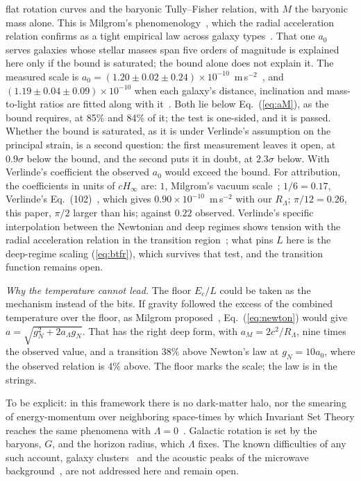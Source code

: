 \documentclass[aps,prd,twocolumn,superscriptaddress,nofootinbib,showkeys]{revtex4-2}
\newcommand{\Ec}{E_c}
\newcommand{\RL}{R_\Lambda}
\begin{document}
flat rotation curves and the baryonic Tully--Fisher relation, with $M$ the baryonic mass alone. This is Milgrom's phenomenology~\cite{milgrom1983}, which the radial acceleration relation confirms as a tight empirical law across galaxy types~\cite{mcgaugh2016}. That one $a_0$ serves galaxies whose stellar masses span five orders of magnitude is explained here only if the bound is saturated; the bound alone does not explain it. The measured scale is $a_0 = (1.20\pm0.02\pm0.24)\times10^{-10}$~m\,s$^{-2}$~\cite{mcgaugh2016}, and $(1.19\pm0.04\pm0.09)\times10^{-10}$ when each galaxy's distance, inclination and mass-to-light ratios are fitted along with it~\cite{desmond2023}. Both lie below Eq.~(\ref{eq:aM}), as the bound requires, at 85\% and 84\% of it; the test is one-sided, and it is passed. Whether the bound is saturated, as it is under Verlinde's assumption on the principal strain, is a second question: the first measurement leaves it open, at $0.9\sigma$ below the bound, and the second puts it in doubt, at $2.3\sigma$ below. With Verlinde's coefficient the observed $a_0$ would exceed the bound. For attribution, the coefficients in units of $cH_\infty$ are: $1$, Milgrom's vacuum scale~\cite{milgrom1999}; $1/6 = 0.17$, Verlinde's Eq.~(102)~\cite{verlinde2017}, which gives $0.90\times10^{-10}$~m\,s$^{-2}$ with our $\RL$; $\pi/12 = 0.26$, this paper, $\pi/2$ larger than his; against $0.22$ observed. Verlinde's specific interpolation between the Newtonian and deep regimes shows tension with the radial acceleration relation in the transition region~\cite{lelli2017}; what pins $L$ here is the deep-regime scaling (\ref{eq:btfr}), which survives that test, and the transition function remains open.

\textit{Why the temperature cannot lead.} The floor $\Ec/L$ could be taken as the mechanism instead of the bits. If gravity followed the excess of the combined temperature over the floor, as Milgrom proposed~\cite{milgrom1999}, Eq.~(\ref{eq:newton}) would give $a = \sqrt{g_N^2 + 2a_\Lambda g_N}$. That has the right deep form, with $a_M = 2c^2/\RL$, nine times the observed value, and a transition 38\% above Newton's law at $g_N = 10a_0$, where the observed relation is 4\% above. The floor marks the scale; the law is in the strings.

To be explicit: in this framework there is no dark-matter halo, nor the smearing of energy-momentum over neighboring space-times by which Invariant Set Theory reaches the same phenomena with $\Lambda = 0$~\cite{palmer2016,hance2025}. Galactic rotation is set by the baryons, $G$, and the horizon radius, which $\Lambda$ fixes. The known difficulties of any such account, galaxy clusters~\cite{clowe2006} and the acoustic peaks of the microwave background~\cite{planck2018}, are not addressed here and remain open.
\end{document}
